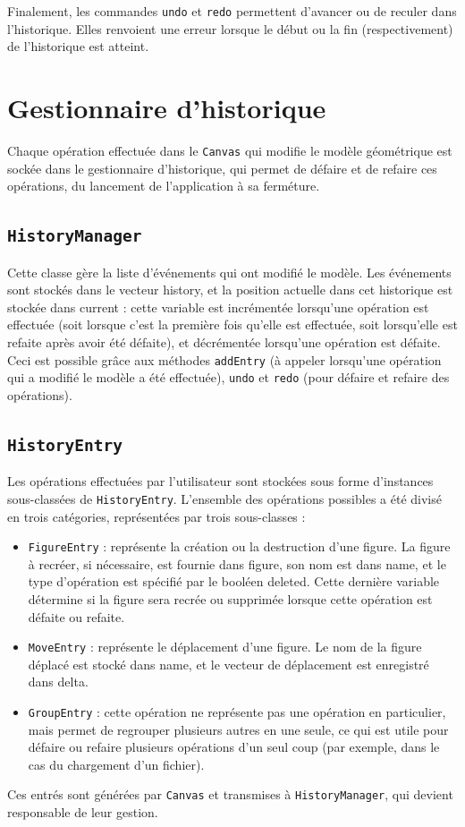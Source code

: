 \documentclass[11pt,a4paper]{article}
\begin{document}
	Finalement, les commandes \texttt{undo} et \texttt{redo} permettent d'avancer ou de reculer dans l'historique. Elles renvoient une erreur lorsque le début ou la fin (respectivement) de l'historique est atteint.
	
	\section{Gestionnaire d'historique}
	Chaque opération effectuée dans le \texttt{Canvas} qui modifie le modèle géométrique est sockée dans le gestionnaire d'historique, qui permet de défaire et de refaire ces opérations, du lancement de l'application à sa ferméture.
	
	\subsection{\texttt{HistoryManager}}
	Cette classe gère la liste d'événements qui ont modifié le modèle. Les événements sont stockés dans le vecteur history, et la position actuelle dans cet historique est stockée dans current : cette variable est incrémentée lorsqu'une opération est effectuée (soit lorsque c'est la première fois qu'elle est effectuée, soit lorsqu'elle est refaite après avoir été défaite), et décrémentée lorsqu'une opération est défaite. Ceci est possible grâce aux méthodes \texttt{addEntry} (à appeler lorsqu'une opération qui a modifié le modèle a été effectuée), \texttt{undo} et \texttt{redo} (pour défaire et refaire des opérations).
	
	\subsection{\texttt{HistoryEntry}}
	Les opérations effectuées par l'utilisateur sont stockées sous forme d'instances sous-classées de \texttt{HistoryEntry}. L'ensemble des opérations possibles a été divisé en trois catégories, représentées par trois sous-classes :
	\begin{itemize}
		\item \texttt{FigureEntry} : représente la création ou la destruction d'une figure. La figure à recréer, si nécessaire, est fournie dans figure, son nom est dans name, et le type d'opération est spécifié par le booléen deleted. Cette dernière variable détermine si la figure sera recrée ou supprimée lorsque cette opération est défaite ou refaite.
		\item \texttt{MoveEntry} : représente le déplacement d'une figure. Le nom de la figure déplacé est stocké dans name, et le vecteur de déplacement est enregistré dans delta.
		\item \texttt{GroupEntry} : cette opération ne représente pas une opération en particulier, mais permet de regrouper plusieurs autres en une seule, ce qui est utile pour défaire ou refaire plusieurs opérations d'un seul coup (par exemple, dans le cas du chargement d'un fichier).
	\end{itemize}
	Ces entrés sont générées par \texttt{Canvas} et transmises à \texttt{HistoryManager}, qui devient responsable de leur gestion.
	
\end{document}
